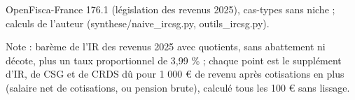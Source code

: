 OpenFisca-France 176.1 (législation des revenus 2025), cas-types sans niche ; calculs de l'auteur (synthese/naive\_ircsg.py, outils\_ircsg.py).\par Note : barème de l'IR des revenus 2025 avec quotients, sans abattement ni décote, plus un taux proportionnel de 3,99 \% ; chaque point est le supplément d'IR, de CSG et de CRDS dû pour 1 000 \euro{} de revenu après cotisations en plus (salaire net de cotisations, ou pension brute), calculé tous les 100 \euro{} sans lissage.
